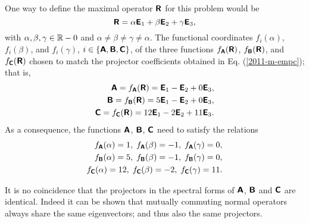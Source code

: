 {One way to define the  maximal operator  $\textsf{\textbf{R}}$ for this problem
would be
$$
\textsf{\textbf{R}} = \alpha \textsf{\textbf{E}}_1  + \beta \textsf{\textbf{E}}_2  + \gamma  \textsf{\textbf{E}}_3,
$$
with
$\alpha ,  \beta ,   \gamma \in {\Bbb R}-0$ and
$\alpha  \neq \beta  \neq   \gamma \neq \alpha  $.
The functional coordinates
$f_i(\alpha )$, $f_i(\beta)$, and $f_i(\gamma)$,
$i\in \{\textsf{\textbf{A}},\textsf{\textbf{B}},\textsf{\textbf{C}}\}$,  of the three functions
$ f_\textsf{\textbf{A}}(\textsf{\textbf{R}})$,
$ f_\textsf{\textbf{B}}(\textsf{\textbf{R}})$, and
$ f_\textsf{\textbf{C}}(\textsf{\textbf{R}})$
chosen to match the projector coefficients obtained in Eq. (\ref{2011-m-empc});
that is,
\begin{equation}
\begin{split}
\textsf{\textbf{A}}= f_\textsf{\textbf{A}}(\textsf{\textbf{R}})=  \textsf{\textbf{E}}_1  - \textsf{\textbf{E}}_2  + 0  \textsf{\textbf{E}}_3,\\
\textsf{\textbf{B}}=  f_\textsf{\textbf{B}}(\textsf{\textbf{R}})= 5\textsf{\textbf{E}}_1  - \textsf{\textbf{E}}_2  + 0 \textsf{\textbf{E}}_3,\\
\textsf{\textbf{C}}=  f_\textsf{\textbf{C}}(\textsf{\textbf{R}})= 12\textsf{\textbf{E}}_1  -2 \textsf{\textbf{E}}_2  + 11\textsf{\textbf{E}}_3.
\end{split}
\end{equation}
As a consequence, the functions
$\textsf{\textbf{A}}$,
$\textsf{\textbf{B}}$,
$\textsf{\textbf{C}}$ need to satisfy the relations
\begin{equation}
\begin{split}
f_\textsf{\textbf{A}}(\alpha ) =1,\; f_\textsf{\textbf{A}}(\beta ) =-1,\; f_\textsf{\textbf{A}}(\gamma ) =0,\\
f_\textsf{\textbf{B}}(\alpha ) =5,\; f_\textsf{\textbf{B}}(\beta ) =-1,\; f_\textsf{\textbf{B}}(\gamma ) =0,\\
f_\textsf{\textbf{C}}(\alpha ) =12,\; f_\textsf{\textbf{C}}(\beta ) =-2,\; f_\textsf{\textbf{C}}(\gamma ) =11.
\end{split}
\label{2011-m-empc-fsr}
\end{equation}

\eexample
}

It is no coincidence that the projectors in the spectral forms of
$\textsf{\textbf{A}}$,
$\textsf{\textbf{B}}$  and
$\textsf{\textbf{C}}$ are identical.
Indeed it can be shown that mutually commuting normal operators always share the same eigenvectors; and thus also the same projectors.

